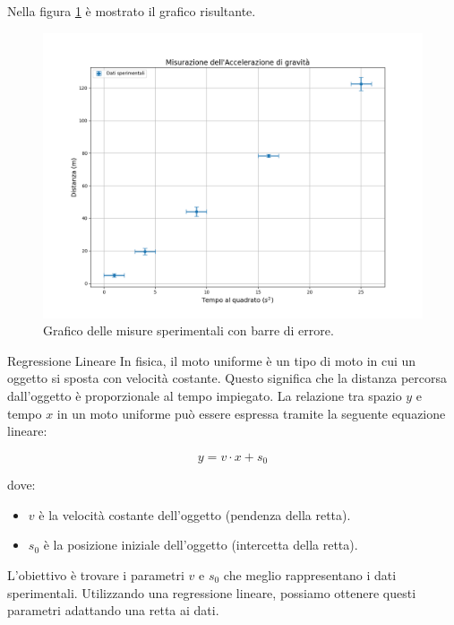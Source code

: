 \documentclass[12pt,a4paper,oneside]{book}
\makeatletter
\renewcommand{\section}{\@startsection{section}{1}{\z@}
{-4ex \@plus -1ex \@minus -.4ex}
{1ex \@plus.2ex }
{\normalfont\large\sffamily\bfseries}}
\theoremstyle{esercizio}
\makeatother
\begin{document}
Nella figura \ref{fig:grafico_misure} è mostrato il grafico risultante.

\begin{figure}[h!]
    \centering
    \includegraphics[width=\textwidth]{grafico_misure.png}
    \caption{Grafico delle misure sperimentali con barre di errore.}
    \label{fig:grafico_misure}
\end{figure}


\section{Regressione Lineare}
In fisica, il moto uniforme è un tipo di moto in cui un oggetto si sposta con velocità costante. Questo significa che la distanza percorsa dall'oggetto è proporzionale al tempo impiegato. La relazione tra spazio \( y \) e tempo \( x \) in un moto uniforme può essere espressa tramite la seguente equazione lineare:

\[
y = v \cdot x + s_0
\]

dove:
\begin{itemize}
    \item \( v \) è la velocità costante dell'oggetto (pendenza della retta).
    \item \( s_0 \) è la posizione iniziale dell'oggetto (intercetta della retta).
\end{itemize}

L'obiettivo è trovare i parametri \( v \) e \( s_0 \) che meglio rappresentano i dati sperimentali. Utilizzando una regressione lineare, possiamo ottenere questi parametri adattando una retta ai dati.
\end{document}
